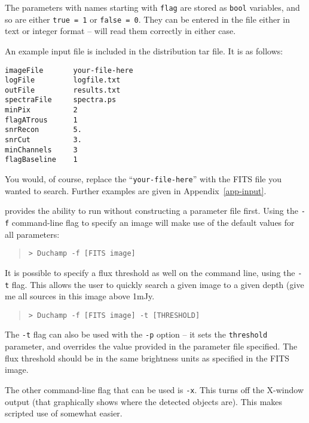 The parameters with names starting with \texttt{flag} are stored as
\texttt{bool} variables, and so are either \texttt{true = 1} or
\texttt{false = 0}. They can be entered in the file either in text or
integer format -- \duchamp will read them correctly in either case.

An example input file is included in the distribution tar file. It is
as follows:

\begin{verbatim}
imageFile       your-file-here
logFile         logfile.txt
outFile         results.txt
spectraFile     spectra.ps
minPix          2
flagATrous      1
snrRecon        5.
snrCut          3.
minChannels     3
flagBaseline    1
\end{verbatim}

You would, of course, replace the ``\texttt{your-file-here}'' with the
FITS file you wanted to search. Further examples are given in
Appendix~\ref{app-input}.


\duchamp provides the ability to run without constructing a parameter
file first. Using the \texttt{-f} command-line flag to specify an
image will make use of the default values for all parameters:
\begin{quote}
{\footnotesize
\texttt{> Duchamp -f [FITS image]}
}
\end{quote}

It is possible to specify a flux threshold as well on the command
line, using the \texttt{-t} flag. This allows the user to quickly
search a given image to a given depth (\ie give me all sources in this
image above 1mJy.
\begin{quote}
{\footnotesize
\texttt{> Duchamp -f [FITS image] -t [THRESHOLD]}
}
\end{quote}
The \texttt{-t} flag can also be used with the \texttt{-p} option --
it sets the \texttt{threshold} parameter, and overrides the value
provided in the parameter file specified. The flux threshold should be
in the same brightness units as specified in the FITS image.

The other command-line flag that can be used is \texttt{-x}. This
turns off the X-window output (that graphically shows where the
detected objects are). This makes scripted use of \duchamp somewhat
easier. 



